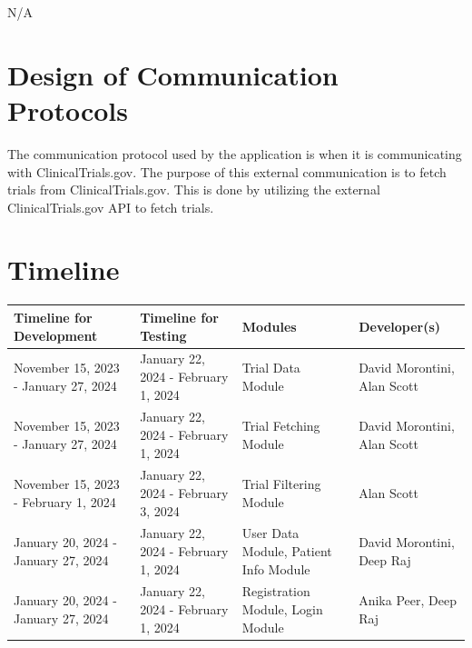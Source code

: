 \documentclass[12pt, titlepage]{article}
\begin{document}
N/A

\section{Design of Communication Protocols}

The communication protocol used by the application is when it is communicating with ClinicalTrials.gov.
The purpose of this external communication is to fetch trials from ClinicalTrials.gov.
This is done by utilizing the external ClinicalTrials.gov API to fetch trials. 

\section{Timeline}

\begin{table}[H]
  \begin{tabular}{|p{}|p{}|p{}|p{}|}
  \hline
  \textbf{Timeline for Development} & \textbf{Timeline for Testing} & \textbf{Modules}                                  & \textbf{Developer(s)} \\ \hline
  November 15, 2023 - January 27, 2024                    & January 22, 2024 - February 1, 2024                & Trial Data Module                                                      & David Morontini, Alan Scott                \\ \hline
  November 15, 2023 - January 27, 2024                    & January 22, 2024 - February 1, 2024                & Trial Fetching Module                                                  & David Morontini, Alan Scott                \\ \hline
  November 15, 2023 - February 1, 2024                    & January 22, 2024 - February 3, 2024                & Trial Filtering Module                                                 & Alan Scott                                 \\ \hline
  January 20, 2024 - January 27, 2024                     & January 22, 2024 - February 1, 2024                & User Data Module, Patient Info Module                                  & David Morontini, Deep Raj                  \\ \hline
  January 20, 2024 - January 27, 2024                     & January 22, 2024 - February 1, 2024                & Registration Module, Login Module                                      & Anika Peer, Deep Raj                       \\ \hline

\end{tabular}
\end{table}
\end{document}
